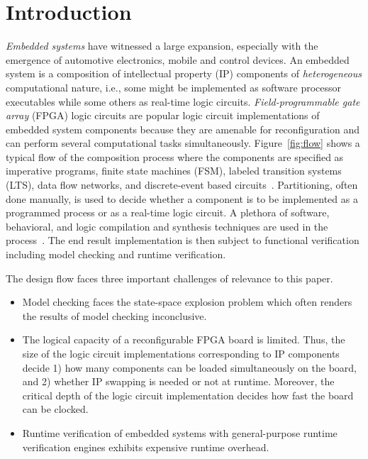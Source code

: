 \section{Introduction}
\label{sect-intro}

\begin{figure*}
\resizebox{1.9\columnwidth}{!}{
  
}
\caption{Embedded system specification, refinement, and implementation stages}
\label{fig:flow}
\end{figure*}

\emph{Embedded systems} have witnessed a large 
expansion, especially with  the emergence of automotive 
electronics, mobile and control devices.
%
An embedded system is a composition of intellectual property (IP) components
of \emph{heterogeneous} computational nature, i.e., some might be implemented as software 
processor executables while some others as real-time logic circuits. 
\emph{Field-programmable gate array} (FPGA) logic circuits are popular logic circuit 
implementations of embedded system components because they are amenable for reconfiguration and can perform several computational tasks simultaneously. 
%
Figure~\ref{fig:flow} shows a typical flow of the composition process where the
components are specified as imperative programs, finite state machines (FSM), labeled 
transition systems (LTS), data flow networks, and discrete-event based circuits~\cite{henzinger2006embedded}.
Partitioning, often done manually, is used to decide whether a component is to 
be implemented as a programmed process or as a real-time logic circuit. 
A plethora of software, behavioral, and logic compilation and synthesis techniques are
used in the process~\cite{metropolis2}.
The end result implementation is then subject to functional verification including 
model checking and runtime verification. 

The design flow faces three important challenges of relevance to this paper. 

\begin{itemize}
\item Model checking faces the state-space explosion problem which often renders the results of model checking inconclusive. 
\item The logical capacity of a reconfigurable FPGA board is limited.
Thus, the size of the logic circuit implementations corresponding to IP components decide 1) how many components can be loaded simultaneously on the board, and 2) whether IP swapping is needed or not at runtime.
Moreover, the critical depth of the logic circuit implementation decides how fast the board can be clocked.
\item Runtime verification of embedded systems with general-purpose runtime verification engines exhibits expensive runtime overhead. 
\end{itemize}


